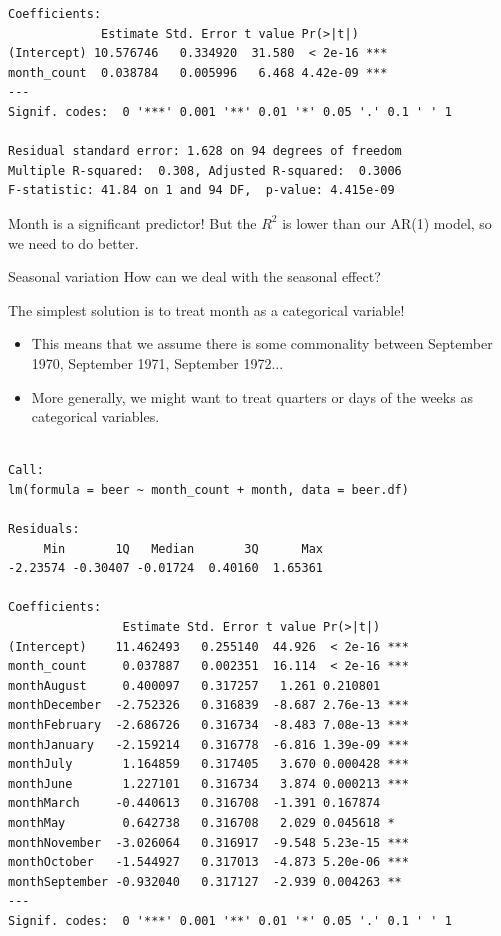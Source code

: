 \documentclass{beamer}\usepackage[]{graphicx}\usepackage[]{color}
\makeatletter
\newenvironment{kframe}{%
 \def\at@end@of@kframe{}%
 \ifinner\ifhmode%
  \def\at@end@of@kframe{\end{minipage}}%
  \begin{minipage}{\columnwidth}%
 \fi\fi%
 \def\FrameCommand##1{\hskip\@totalleftmargin \hskip-\fboxsep
 \colorbox{shadecolor}{##1}\hskip-\fboxsep
     \hskip-\linewidth \hskip-\@totalleftmargin \hskip\columnwidth}%
 \MakeFramed {\advance\hsize-\width
   \@totalleftmargin\z@ \linewidth\hsize
   \@setminipage}}%
 {\par\unskip\endMakeFramed%
 \at@end@of@kframe}
\newenvironment{knitrout}{}{} %
\makeatother
\begin{document}
\begin{darkframes}
\begin{frame}[fragile]
\begin{knitrout}
\begin{kframe}
\begin{verbatim}
Coefficients:
             Estimate Std. Error t value Pr(>|t|)    
(Intercept) 10.576746   0.334920  31.580  < 2e-16 ***
month_count  0.038784   0.005996   6.468 4.42e-09 ***
---
Signif. codes:  0 '***' 0.001 '**' 0.01 '*' 0.05 '.' 0.1 ' ' 1

Residual standard error: 1.628 on 94 degrees of freedom
Multiple R-squared:  0.308,	Adjusted R-squared:  0.3006 
F-statistic: 41.84 on 1 and 94 DF,  p-value: 4.415e-09
\end{verbatim}
\end{kframe}
\end{knitrout}
      \pause
      Month is a significant predictor! But the $R^2$ is lower than our AR(1) model, so we need to do better.
\end{frame}


\begin{frame}{Seasonal variation}
How can we deal with the seasonal effect?
\pause
\bigskip

The simplest solution is to treat month as a categorical variable!
\begin{itemize}
\item This means that we assume there is some commonality between September 1970, September 1971, September 1972...
\item More generally, we might want to treat quarters or days of the weeks as categorical variables.
\end{itemize}
\end{frame}

\begin{frame}[fragile]%
    \fontsize{7}{7}\selectfont

\begin{knitrout}
\begin{kframe}
\begin{verbatim}

Call:
lm(formula = beer ~ month_count + month, data = beer.df)

Residuals:
     Min       1Q   Median       3Q      Max 
-2.23574 -0.30407 -0.01724  0.40160  1.65361 

Coefficients:
                Estimate Std. Error t value Pr(>|t|)    
(Intercept)    11.462493   0.255140  44.926  < 2e-16 ***
month_count     0.037887   0.002351  16.114  < 2e-16 ***
monthAugust     0.400097   0.317257   1.261 0.210801    
monthDecember  -2.752326   0.316839  -8.687 2.76e-13 ***
monthFebruary  -2.686726   0.316734  -8.483 7.08e-13 ***
monthJanuary   -2.159214   0.316778  -6.816 1.39e-09 ***
monthJuly       1.164859   0.317405   3.670 0.000428 ***
monthJune       1.227101   0.316734   3.874 0.000213 ***
monthMarch     -0.440613   0.316708  -1.391 0.167874    
monthMay        0.642738   0.316708   2.029 0.045618 *  
monthNovember  -3.026064   0.316917  -9.548 5.23e-15 ***
monthOctober   -1.544927   0.317013  -4.873 5.20e-06 ***
monthSeptember -0.932040   0.317127  -2.939 0.004263 ** 
---
Signif. codes:  0 '***' 0.001 '**' 0.01 '*' 0.05 '.' 0.1 ' ' 1


\end{verbatim}
\end{kframe}
\end{knitrout}
\end{frame}
\end{darkframes}
\end{document}
